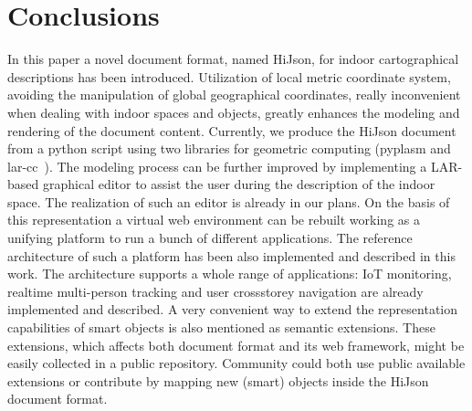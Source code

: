 \documentclass{sig-alternate}
\begin{document}
\section{Conclusions}

In this paper a novel document format, named HiJson, for indoor cartographical descriptions has been introduced. Utilization of local metric coordinate system, avoiding the manipulation of global geographical coordinates, really inconvenient when dealing with indoor spaces and objects, greatly enhances the modeling and rendering of the document content. Currently, we produce the HiJson document from a python script using two libraries for geometric computing (pyplasm and lar-cc~\cite{Dicarlo:2014:TNL:2543138.2543294,cadanda:2015}). The modeling process can be further improved by implementing a LAR-based graphical editor to assist the user during the description of the indoor space. The realization of such an editor is already in our plans.
On the basis of this representation a virtual web environment can be rebuilt working as a unifying platform to run a bunch of different applications. The reference architecture of such a platform has been also implemented and described in this work.
The architecture supports a whole range of applications: IoT monitoring, realtime multi-person tracking and user crossstorey navigation are already implemented and described. A very convenient way to extend the representation capabilities of smart objects is also mentioned as semantic extensions. These extensions, which affects both document format and its web framework, might be easily collected in a public repository. Community could both use public available extensions or contribute by mapping new (smart) objects inside the HiJson document format.


\end{document}
